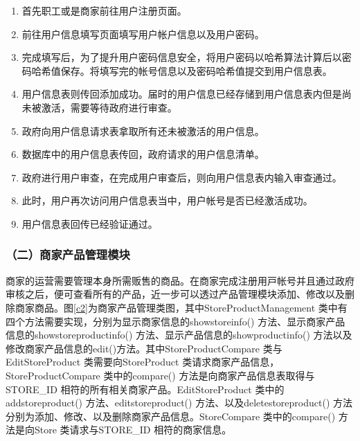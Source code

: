 	\begin{enumerate}
	\item 首先职工或是商家前往用户注册页面。
	\item 前往用户信息填写页面填写用户帐户信息以及用户密码。
	\item 完成填写后，为了提升用户密码信息安全，将用户密码以哈希算法计算后以密码哈希值保存。将填写完的帐号信息以及密码哈希值提交到用户信息表。
	\item 用户信息表则传回添加成功。届时的用户信息已经存储到用户信息表内但是尚未被激活，需要等待政府进行审查。
	\item 政府向用户信息请求表拿取所有还未被激活的用户信息。
	\item 数据库中的用户信息表传回，政府请求的用户信息清单。
	\item 政府进行用户审查，在完成用户审查后，则向用户信息表内输入审查通过。
	\item 此时，用户再次访问用户信息表当中，用户帐号是否已经激活成功。
	\item 用户信息表回传已经验证通过。
	\end{enumerate}


\subsubsection{（二）商家产品管理模块}
商家的运营需要管理本⾝所需贩售的商品。在商家完成注册⽤⼾帐号并且通过政府审核之后，便可查看所有的产品，近⼀步可以透过产品管理模块添加、修改以及删除商家商品。图\ref{c2}为商家产品管理类图，其中StoreProductManagement 类中有四个⽅法需要实现，分别为显⽰商家信息的showstoreinfo() ⽅法、显⽰商家产品信息的showstoreproductinfo() ⽅法、显⽰产品信息的showproductinfo() 方法以及修改商家产品信息的edit()⽅法。其中StoreProductCompare 类与EditStoreProduct 类需要向StoreProduct 类请求商家产品信息，StoreProductCompare 类中的compare() ⽅法是向商家产品信息表取得与STORE\_ID 相符的所有相关商家产品。EditStoreProduct 类中的addstoreproduct() ⽅法、editstoreproduct() ⽅法、以及deletestoreproduct() ⽅法分别为添加、修改、以及删除商家产品信息。StoreCompare 类中的compare() ⽅法是向Store 类请求与STORE\_ID 相符的商家信息。

